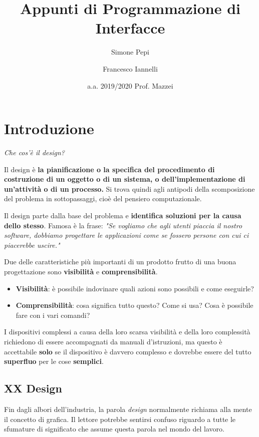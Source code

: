 \documentclass[a4paper,11pt,oneside]{book}
\begin{document}
\title{Appunti di Programmazione di Interfacce}

\author[1]{Simone Pepi}
\author[2]{Francesco Iannelli}
\date{a.a. 2019/2020 Prof. Mazzei}
\maketitle

\tableofcontents

\chapter{Introduzione}
\begin{flushleft}
	\textit{Che cos'è il design?}
\end{flushleft}
Il design è \textbf{la pianificazione o la specifica del procedimento di costruzione di un oggetto o di un sistema, o dell'implementazione di un'attività o di un processo.} Si trova quindi agli antipodi della scomposizione del problema in sottopassaggi, cioè del pensiero computazionale.

Il design parte dalla base del problema e \textbf{identifica soluzioni per la causa dello stesso}.
Famosa è la frase: \textit{"Se vogliamo che agli utenti piaccia il nostro software, dobbiamo progettare le applicazioni come se fossero persone con cui ci piacerebbe uscire."}

Due delle caratteristiche più importanti di un prodotto frutto di una buona progettazione sono \textbf{visibilità} e \textbf{comprensibilità}.

\begin{itemize}
	\item \textbf{Visibilità}: è possibile indovinare quali azioni sono possibili e come eseguirle?
	\item \textbf{Comprensibilità}: cosa significa tutto questo? Come si usa? Cosa è possibile fare con i vari comandi?
\end{itemize}

I dispositivi complessi a causa della loro scarsa visibilità e della loro complessità richiedono di essere accompagnati da manuali d'istruzioni, ma questo è accettabile \textbf{solo} se il dispositivo è davvero complesso e dovrebbe essere del tutto \textbf{superfluo} per le cose \textbf{semplici}.

\section{XX Design}
Fin dagli albori dell'industria, la parola \textit{design} normalmente richiama alla mente il concetto di grafica. Il lettore potrebbe sentirsi confuso riguardo a tutte le sfumature di significato che assume questa parola nel mondo del lavoro.
\end{document}
